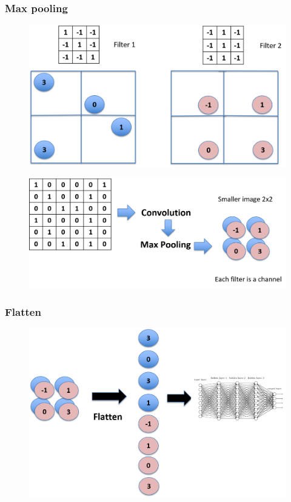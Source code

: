 \documentclass{beamer}
\begin{document}
\begin{frame}
	\frametitle{Max pooling}
	\begin{figure}
	\includegraphics[width=0.8\linewidth]{Picture8}
	\end{figure}
\end{frame}

\begin{frame}
	\begin{figure}
	\includegraphics[width=\linewidth]{Picture9}
	\end{figure}
\end{frame}

\begin{frame}
	\frametitle{Flatten}
	\begin{figure}
	\includegraphics[width=\linewidth]{Picture10}
	\end{figure}
\end{frame}
\end{document}

